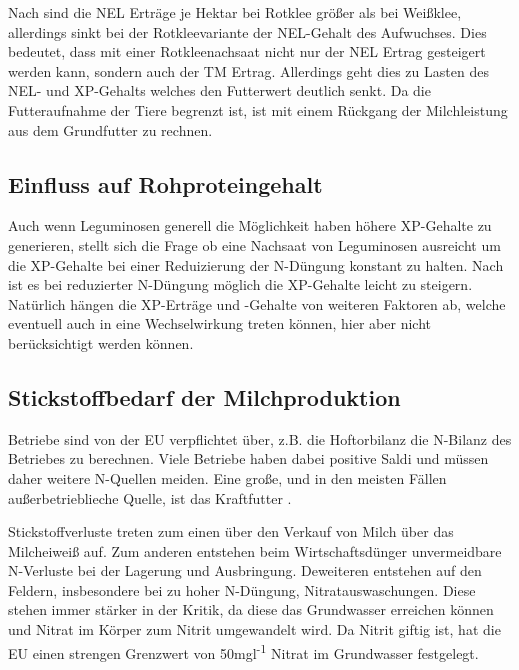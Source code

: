 Nach \textcite[35-36]{weggler2050leguminosen} sind die \ac{NEL} Erträge je Hektar bei Rotklee größer als bei Weißklee, allerdings sinkt bei der Rotkleevariante der \ac{NEL}-Gehalt des Aufwuchses.
Dies bedeutet, dass mit einer Rotkleenachsaat nicht nur der \ac{NEL} Ertrag gesteigert werden kann, sondern auch der \ac{TM} Ertrag.
Allerdings geht dies zu Lasten des \ac{NEL}- und \ac{XP}-Gehalts welches den Futterwert deutlich senkt.
Da die Futteraufnahme der Tiere begrenzt ist, ist mit einem Rückgang der Milchleistung aus dem Grundfutter zu rechnen.

\subsection{Einfluss auf Rohproteingehalt}
\label{subsec:Protein}

Auch wenn Leguminosen generell die Möglichkeit haben höhere \ac{XP}-Gehalte zu generieren, stellt sich die Frage ob eine Nachsaat von Leguminosen ausreicht um die \ac{XP}-Gehalte bei einer Reduizierung der N-Düngung konstant zu halten.
Nach \textcite[11]{engel2013protein} ist es bei reduzierter N-Düngung möglich die \ac{XP}-Gehalte leicht zu steigern.
Natürlich hängen die \ac{XP}-Erträge und -Gehalte von weiteren Faktoren ab, welche eventuell auch in eine Wechselwirkung treten können, hier aber nicht berücksichtigt werden können.





\subsection{Stickstoffbedarf der Milchproduktion}
\label{subsec:Stickstoff}
Betriebe sind von der \ac{EU} verpflichtet über, z.B. die Hoftorbilanz die N-Bilanz des Betriebes zu berechnen.
Viele Betriebe haben dabei positive Saldi \parencite[7ff]{lellmann2005untersuchungen} und müssen daher weitere N-Quellen meiden.
Eine große, und in den meisten Fällen außerbetrieblieche Quelle, ist das Kraftfutter \parencite[62]{lellmann2005untersuchungen}.

Stickstoffverluste treten zum einen über den Verkauf von Milch über das Milcheiweiß auf.
Zum anderen entstehen beim Wirtschaftsdünger unvermeidbare N-Verluste bei der Lagerung und Ausbringung.
Deweiteren entstehen auf den Feldern, insbesondere bei zu hoher N-Düngung, Nitratauswaschungen.
Diese stehen immer stärker in der Kritik, da diese das Grundwasser erreichen können und Nitrat im Körper zum Nitrit umgewandelt wird.
Da Nitrit giftig ist, hat die \ac{EU} einen strengen Grenzwert von 50mgl\textsuperscript{-1} Nitrat im Grundwasser festgelegt.



